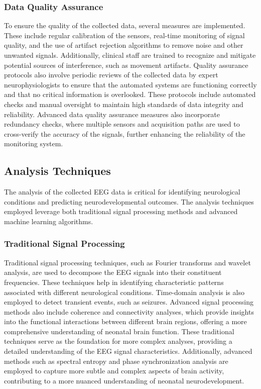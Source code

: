 \documentclass[12pt,journal,compsoc]{IEEEtran}
\begin{document}
\subsubsection{Data Quality Assurance}

To ensure the quality of the collected data, several measures are implemented. These include regular calibration of the sensors, real-time monitoring of signal quality, and the use of artifact rejection algorithms to remove noise and other unwanted signals. Additionally, clinical staff are trained to recognize and mitigate potential sources of interference, such as movement artifacts. Quality assurance protocols also involve periodic reviews of the collected data by expert neurophysiologists to ensure that the automated systems are functioning correctly and that no critical information is overlooked. These protocols include automated checks and manual oversight to maintain high standards of data integrity and reliability. Advanced data quality assurance measures also incorporate redundancy checks, where multiple sensors and acquisition paths are used to cross-verify the accuracy of the signals, further enhancing the reliability of the monitoring system.

\subsection{Analysis Techniques}

The analysis of the collected EEG data is critical for identifying neurological conditions and predicting neurodevelopmental outcomes. The analysis techniques employed leverage both traditional signal processing methods and advanced machine learning algorithms.

\subsubsection{Traditional Signal Processing}

Traditional signal processing techniques, such as Fourier transforms and wavelet analysis, are used to decompose the EEG signals into their constituent frequencies. These techniques help in identifying characteristic patterns associated with different neurological conditions. Time-domain analysis is also employed to detect transient events, such as seizures. Advanced signal processing methods also include coherence and connectivity analyses, which provide insights into the functional interactions between different brain regions, offering a more comprehensive understanding of neonatal brain function. These traditional techniques serve as the foundation for more complex analyses, providing a detailed understanding of the EEG signal characteristics. Additionally, advanced methods such as spectral entropy and phase synchronization analysis are employed to capture more subtle and complex aspects of brain activity, contributing to a more nuanced understanding of neonatal neurodevelopment.
\end{document}
